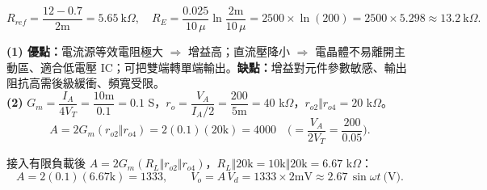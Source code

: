 \documentclass[12pt]{article}
\begin{document}
\sol
\[ R_{ref}=\frac{12-0.7}{2\text{m}}=5.65\ \text{k}\Omega,\quad
   R_E=\frac{0.025}{10\,\mu}\ln\frac{2\text{m}}{10\,\mu}=2500\times\ln(200)=2500\times5.298\approx13.2\ \text{k}\Omega. \]

\begin{minipage}{0.62\linewidth}
\end{minipage}\hfill
\begin{minipage}{0.35\linewidth}
\end{minipage}

\sol
\textbf{(1) 優點：}電流源等效電阻極大 $\Rightarrow$ 增益高；直流壓降小 $\Rightarrow$ 電晶體不易離開主動區、適合低電壓 IC；可把雙端轉單端輸出。\textbf{缺點：}增益對元件參數敏感、輸出阻抗高需後級緩衝、頻寬受限。\\
\textbf{(2)} $G_m=\dfrac{I_A}{4V_T}=\dfrac{10\text{m}}{0.1}=0.1$ S，$r_o=\dfrac{V_A}{I_A/2}=\dfrac{200}{5\text{m}}=40$ k$\Omega$，$r_{o2}\Vert r_{o4}=20$ k$\Omega$。
\[ A=2G_m(r_{o2}\Vert r_{o4})=2(0.1)(20\text{k})=4000\quad\Big(=\frac{V_A}{2V_T}=\frac{200}{0.05}\Big). \]

\sol 接入有限負載後 $A=2G_m(R_L\Vert r_{o2}\Vert r_{o4})$，$R_L\Vert20\text{k}=10\text{k}\Vert20\text{k}=6.67$ k$\Omega$：
\[ A=2(0.1)(6.67\text{k})=1333,\qquad V_o=A\,V_d=1333\times2\text{mV}\approx2.67\,\sin\omega t\ \text{(V)}. \]

\begin{minipage}{0.64\linewidth}
\end{minipage}\hfill
\begin{minipage}{0.33\linewidth}
\end{minipage}
\end{document}
